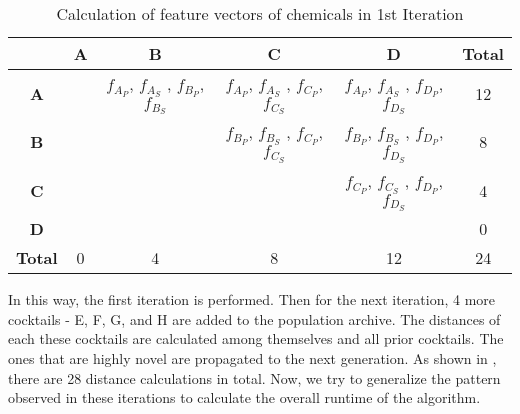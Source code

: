 \begin{table}[htbp]
\begin{center}
\caption{Calculation of feature vectors of chemicals in 1st Iteration}
\begin{tabular}{|c|c|c|c|c|c|}
\hline
 & \textbf{A} & \textbf{B} & \textbf{C} & \textbf{D} & \textbf{Total} \\
\hline
\textbf{A} & & $f_{A_{P}}$, $f_{A_{S}}$ , $f_{B_{P}}$, $f_{B_{S}}$  & $f_{A_{P}}$, $f_{A_{S}}$ , $f_{C_{P}}$, $f_{C_{S}}$  & $f_{A_{P}}$, $f_{A_{S}}$ , $f_{D_{P}}$, $f_{D_{S}}$  & 12 \\
\hline
\textbf{B} & & & $f_{B_{P}}$, $f_{B_{S}}$ , $f_{C_{P}}$, $f_{C_{S}}$  & $f_{B_{P}}$, $f_{B_{S}}$ , $f_{D_{P}}$, $f_{D_{S}}$  & 8 \\
\hline
\textbf{C} &  &  &  & $f_{C_{P}}$, $f_{C_{S}}$ , $f_{D_{P}}$, $f_{D_{S}}$  & 4 \\
\hline
\textbf{D} &  &  &  &   & 0 \\
\hline
\textbf{Total} & 0 & 4 & 8 & 12 & 24 \\
\hline
\end{tabular}
\label{iteration_1_methodology_table3}
\end{center}
\end{table}



In this way, the first iteration is performed. Then for the next iteration, 4 more cocktails - E, F, G, and H are added to the population archive. The distances of each these cocktails are calculated among themselves and all prior cocktails. The ones that are highly novel are propagated to the next generation. As shown in , there are 28 distance calculations in total. Now, we try to generalize the pattern observed in these iterations to calculate the overall runtime of the algorithm.

